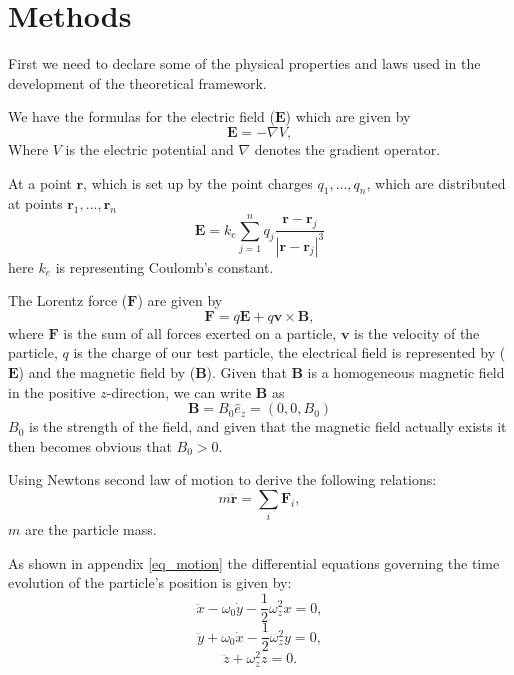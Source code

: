 \documentclass[english,notitlepage,reprint,nofootinbib]{revtex4-1}  %
\begin{document}
	\section{Methods}\label{sec:methods}
First we need to declare some of the physical properties and laws used in the development of the theoretical framework.

We have the formulas for the electric field ($\mathbf{E}$) which are given by
\begin{equation} \label{eq:electric field}
	\mathbf{E} = -\nabla V,
\end{equation}
Where $V$ is the electric potential and $\nabla$ denotes the gradient operator.

At a point $\mathbf{r}$, which is set up by the point charges ${q_1, ..., q_n}$, which are distributed at points ${\mathbf{r}_1, ..., \mathbf{r}_n}$
\begin{equation} \label{eq:electric field2}
	\mathbf{E} = k_e \sum_{j=1}^n q_j \frac{\mathbf{r}-\mathbf{r}_j}{|\mathbf{r}-\mathbf{r}_j|^3}
\end{equation}
here $k_e$ is representing Coulomb’s constant.

The Lorentz force ($\mathbf{F}$) are given by
\begin{equation} \label{eq:Lorentz force}
	\mathbf{F} = q\mathbf{E} + q\mathbf{v}\times \mathbf{B},
\end{equation}
where $\mathbf{F}$ is the sum of all forces exerted on a particle, $\mathbf{v}$ is the velocity of the particle, $q$ is the charge of our test particle, the electrical field is represented by ($\mathbf{E}$) and the magnetic field by ($\mathbf{B}$). Given that $\mathbf{B}$ is a homogeneous magnetic field in the positive $z$-direction, we can write $\mathbf{B}$ as
\begin{equation} \label{eq:Bfield}
	\mathbf{B} = B_0\hat{e}_z = (0, 0, B_0)
\end{equation}
$B_0$ is the strength of the field, and given that the magnetic field actually exists it then becomes obvious that $B_0 > 0$.

Using Newtons second law of motion to derive the following relations:
\begin{equation} \label{eq:newtons2}
	m\ddot{\mathbf{r}} = \sum_i \mathbf{F}_i,
\end{equation}
$m$ are the particle mass.

As shown in appendix \ref{eq_motion} the differential equations governing the time evolution of the particle’s position is given by:
\begin{equation}\label{eq:newtonx}
	\ddot{x} - \omega_0 \dot{y} - \frac{1}{2}\omega_z^2 x = 0, 
\end{equation}
\begin{equation} \label{eq:newtony}
	\ddot{y} + \omega_0 \dot{x} - \frac{1}{2}\omega_z^2 y = 0,
\end{equation}
\begin{equation} \label{eq:newtonz}
	\ddot{z} + \omega_z^2 z = 0. 
\end{equation}
\end{document}
